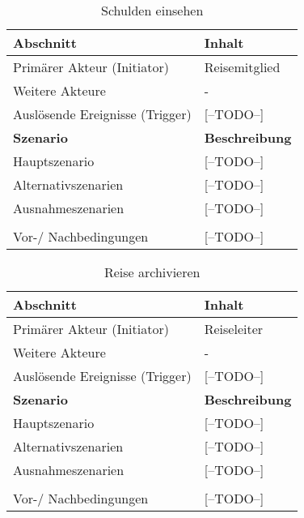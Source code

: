 \begin{table}[H]
\caption{Schulden einsehen}
\begin{tabularx}{0.95\textwidth}{ |X|X| }
\hline
\rowcolor{gray} \textbf{Abschnitt} & \textbf{Inhalt} \\
\hline
	Primärer Akteur (Initiator) & Reisemitglied \\
\hline
	Weitere Akteure & - \\
\hline
	Auslösende Ereignisse (Trigger) & [--TODO--] \\

\hline
\rowcolor{lightgray} \textbf{Szenario} & \textbf{Beschreibung} \\
\hline
	Hauptszenario & [--TODO--] \\
\hline
  	Alternativszenarien & [--TODO--] \\
\hline
  	Ausnahmeszenarien & [--TODO--] \\
\hline
\rowcolor{lightgray} & \\
\hline
  	Vor-/ Nachbedingungen & [--TODO--] \\
\hline
\end{tabularx}
\end{table}


\begin{table}[H]
\caption{Reise archivieren}
\begin{tabularx}{0.95\textwidth}{ |X|X| }
\hline
\rowcolor{gray} \textbf{Abschnitt} & \textbf{Inhalt} \\
\hline
	Primärer Akteur (Initiator) & Reiseleiter \\
\hline
	Weitere Akteure & - \\
\hline
	Auslösende Ereignisse (Trigger) & [--TODO--] \\

\hline
\rowcolor{lightgray} \textbf{Szenario} & \textbf{Beschreibung} \\
\hline
	Hauptszenario & [--TODO--] \\
\hline
  	Alternativszenarien & [--TODO--] \\
\hline
  	Ausnahmeszenarien & [--TODO--] \\
\hline
\rowcolor{lightgray} & \\
\hline
  	Vor-/ Nachbedingungen & [--TODO--] \\
\hline
\end{tabularx}
\end{table}


